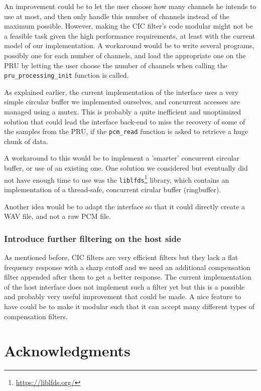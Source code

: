 \documentclass[]{report}
\begin{document}
An improvement could be to let the user choose how many channels he intends to use at most, and then only handle this number of channels instead of the maximum possible. However, making the CIC filter's code modular might not be a feasible task given the high performance requirements, at least with the current model of our implementation. A workaround would be to write several programs, possibly one for each number of channels, and load the appropriate one on the PRU by letting the user choose the number of channels when calling the \texttt{pru\_processing\_init} function is called.

As explained earlier, the current implementation of the interface uses a very simple circular buffer we implemented ourselves, and concurrent accesses are managed using a mutex. This is probably a quite inefficient and unoptimized solution that could lead the interface back-end to miss the recovery of some of the samples from the PRU, if the \texttt{pcm\_read} function is asked to retrieve a huge chunk of data.

A workaround to this would be to implement a 'smarter' concurrent circular buffer, or use of an existing one. One solution we considered but eventually did not have enough time to use was the \texttt{liblfds}\footnote{\url{https://liblfds.org/}} library, which contains an implementation of a thread-safe, concurrent cirular buffer (ringbuffer).

Another idea would be to adapt the interface so that it could directly create a WAV file, and not a raw PCM file.

\hypertarget{introduce-further-filtering-on-the-host-side}{%
\subsection{Introduce further filtering on the host
side}\label{introduce-further-filtering-on-the-host-side}}

As mentioned before, CIC filters are very efficient filters but they lack a flat frequency response with a sharp cutoff and we need an additional compensation filter appended after them to get a better response. The current implementation of the host interface does not implement such a filter yet but this is a possible and probably very useful improvement that could be made. A nice feature to have could be to make it modular such that it can accept many different types of compensation filters.

\hypertarget{acknowledgments}{%
\chapter{Acknowledgments}\label{acknowledgments}}
\end{document}
